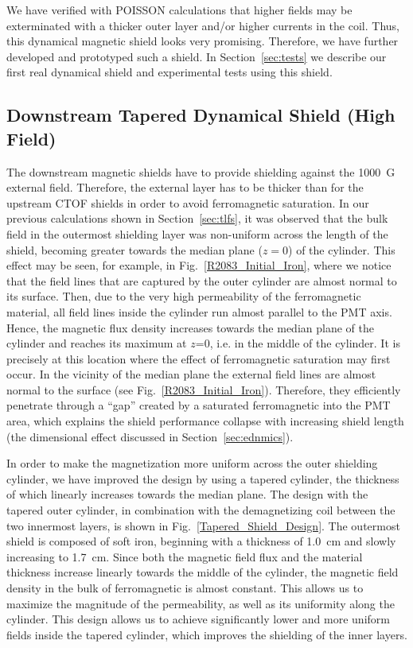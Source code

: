 \documentclass[12pt]{article}
\begin{document}
We have verified with POISSON calculations that higher fields may be  
exterminated with a thicker outer layer and/or higher currents in the coil.
Thus, this dynamical magnetic shield looks very promising. Therefore, we have 
further developed and prototyped such a shield. In Section~\ref{sec:tests} we 
describe our first real dynamical shield and experimental tests using this shield.

\subsection{Downstream Tapered Dynamical Shield (High Field)}
\label{sec:tapered}

The downstream magnetic shields have to provide shielding against the 1000~G 
external field. Therefore, the external layer has to be thicker than for the
upstream CTOF shields in order to avoid ferromagnetic saturation. In our previous 
calculations shown in Section~\ref{sec:tlfs}, it was observed that the bulk field 
in the outermost shielding layer was non-uniform across the length of the shield, 
becoming greater towards the median plane ($z=0$) of the cylinder. This effect may 
be seen, for example, in Fig.~\ref{R2083_Initial_Iron}, where we notice that the 
field lines that are captured by the outer cylinder are almost normal to its surface. 
Then, due to the very high permeability of the ferromagnetic material, all field 
lines inside the cylinder run almost parallel to the PMT axis. Hence, the magnetic 
flux density increases towards the median plane of the cylinder and reaches its 
maximum at $z$=0, i.e. in the middle of the cylinder. It is precisely at this
location where the effect of ferromagnetic saturation may first occur. In the vicinity 
of the median plane the external field lines are almost normal to the surface (see 
Fig.~\ref{R2083_Initial_Iron}). Therefore, they efficiently penetrate through a 
``gap'' created by a saturated ferromagnetic into the PMT area, which explains the 
shield performance collapse with increasing shield length (the dimensional effect
discussed in Section~\ref{sec:ednmics}). 

In order to make the magnetization more uniform across the outer shielding
cylinder, we have improved the design by using a tapered cylinder, the 
thickness of which linearly increases towards the median plane. The design with 
the tapered outer cylinder, in combination with the demagnetizing coil between 
the two innermost layers, is shown in Fig.~\ref{Tapered_Shield_Design}. The 
outermost shield is composed of soft iron, beginning with a thickness of 1.0~cm 
and slowly increasing to 1.7~cm. Since both the magnetic field flux and the material 
thickness increase linearly towards the middle of the cylinder, the magnetic field 
density in the bulk of ferromagnetic is almost constant. This allows us to maximize 
the magnitude of the permeability, as well as its uniformity along the cylinder.
This design allows us to achieve significantly lower and more uniform fields inside 
the tapered cylinder, which improves the shielding of the inner layers. 
\end{document}
